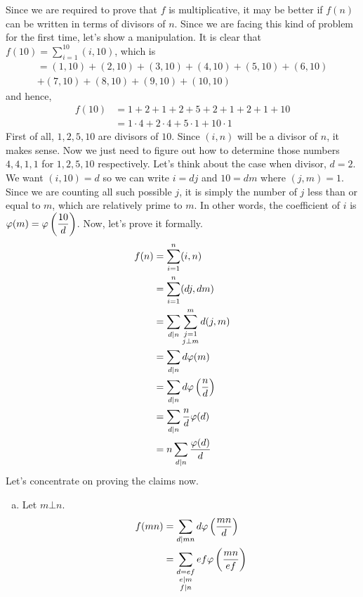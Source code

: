 \begin{solution}
	Since we are required to prove that $f$ is multiplicative, it may be better if $f(n)$ can be written in terms of divisors of $n$. Since we are facing this kind of problem for the first time, let's show a manipulation. It is clear that $f(10) = \sum_{i=1}^{10}(i,10)$, which is
		\begin{multline*}
		  = (1,10)+(2,10)+(3,10)+(4,10)+(5,10)+(6,10)\\+(7,10)+(8,10)+(9,10)+(10,10)
		\end{multline*}
	and hence,
		\begin{align*}
			f(10)
				& = 1+2+1+2+5+2+1+2+1+10\\
				& = 1\cdot4+2\cdot4+5\cdot1+10\cdot1
		\end{align*}
	First of all, $1,2,5,10$ are divisors of $10$. Since $(i,n)$ will be a divisor of $n$, it makes sense. Now we just need to figure out how to determine those numbers $4,4,1,1$ for $1,2,5,10$ respectively. Let's think about the case when divisor, $d=2$. We want $(i,10)=d$ so we can write $i=dj$ and $10=dm$ where $(j,m)=1$. Since we are counting all such possible $j$, it is simply the number of $j$ less than or equal to $m$, which are relatively prime to $m$. In other words, the coefficient of $i$ is $\varphi(m)=\varphi\left(\dfrac{10}{d}\right)$. Now, let's prove it formally.
		\begin{align*}
			f(n)
				& = \sum_{i=1}^{n}(i,n)\\
				& = \sum_{i=1}^{n}(dj,dm)\\
				& = \sum_{d\mid n}\sum_{\substack{j=1\\j\bot m}}^{m}d(j,m)\\
				& = \sum_{d\mid n}d\varphi(m)\\
				& = \sum_{d\mid n}d\varphi\left(\dfrac{n}{d}\right)\\
				& = \sum_{d\mid n}\dfrac{n}{d}\varphi(d)\\
				& = n\sum_{d\mid n}\dfrac{\varphi(d)}{d}
		\end{align*}
	Let's concentrate on proving the claims now.
		\begin{enumerate}[(a)]
			\item Let $m\bot n$.
					\begin{align*}
						f(mn) & = \sum_{d\mid mn}d\varphi\parenthesis{\dfrac{mn}{d}}\\
					  & = \sum_{\substack{d=ef\\e\mid m\\f\mid n}}ef\varphi\parenthesis{\dfrac{mn}{ef}}\\

\end{align*}
\end{enumerate}
\end{solution}
